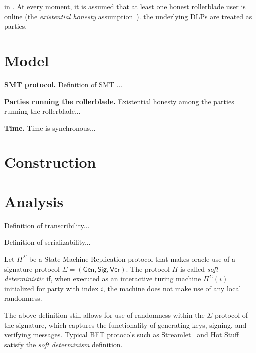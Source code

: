 in . At every moment, it is
assumed that at least one honest rollerblade user is online (the
\emph{existential honesty} assumption~\cite{backbone}).
the underlying DLPs are treated as parties.

\section{Model}

\noindent
\textbf{SMT protocol.}
Definition of SMT ...

\noindent
\textbf{Parties running the rollerblade.}
Existential honesty among the parties running the rollerblade...

\noindent
\textbf{Time.}
Time is synchronous...

\section{Construction}

\section{Analysis}

\begin{definition}[Transcribability]
      Definition of transcribility...
\end{definition}

\begin{definition}[Serializability]
      Definition of serializability...
\end{definition}

\begin{definition}
      Let $\Pi^\Sigma$ be a State Machine Replication protocol that makes
      oracle use of a signature protocol $\Sigma = (\textsf{Gen}, \textsf{Sig}, \textsf{Ver})$.
      The protocol $\Pi$ is called \emph{soft deterministic} if,
      when executed as an interactive turing machine $\Pi^\Sigma(i)$ initialized for party
      with index $i$, the machine does not make use of any local randomness.
\end{definition}

The above definition still allows for use of randomness within the $\Sigma$ protocol of the
signature, which captures the functionality of generating keys, signing, and verifying
messages. Typical BFT protocols such as Streamlet~\cite{streamlet} and Hot Stuff~\cite{hot-stuff}
satisfy the \emph{soft determinism} definition.

